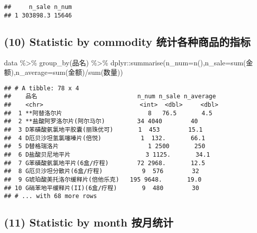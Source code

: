 \documentclass[
]{article}
\newenvironment{Shaded}{\begin{snugshade}}{\end{snugshade}}
\newcommand{\AttributeTok}[1]{\textcolor[rgb]{0.77,0.63,0.00}{#1}}
\newcommand{\FunctionTok}[1]{\textcolor[rgb]{0.00,0.00,0.00}{#1}}
\newcommand{\NormalTok}[1]{#1}
\newcommand{\SpecialCharTok}[1]{\textcolor[rgb]{0.00,0.00,0.00}{#1}}
\begin{document}
\begin{verbatim}
##     n_sale n_num
## 1 303898.3 15646
\end{verbatim}

\hypertarget{statistic-by-commodity-ux7edfux8ba1ux5404ux79cdux5546ux54c1ux7684ux6307ux6807}{%
\subsection{(10) Statistic by commodity
统计各种商品的指标}\label{statistic-by-commodity-ux7edfux8ba1ux5404ux79cdux5546ux54c1ux7684ux6307ux6807}}

\begin{Shaded}
\begin{Highlighting}[]
\NormalTok{data }\SpecialCharTok{\%\textgreater{}\%} \FunctionTok{group\_by}\NormalTok{(品名) }\SpecialCharTok{\%\textgreater{}\%}\NormalTok{ dplyr}\SpecialCharTok{::}\FunctionTok{summarise}\NormalTok{(}\AttributeTok{n\_num=}\FunctionTok{n}\NormalTok{(),}\AttributeTok{n\_sale=}\FunctionTok{sum}\NormalTok{(金额),}\AttributeTok{n\_average=}\FunctionTok{sum}\NormalTok{(金额)}\SpecialCharTok{/}\FunctionTok{sum}\NormalTok{(数量))}
\end{Highlighting}
\end{Shaded}

\begin{verbatim}
## # A tibble: 78 x 4
##    品名                            n_num n_sale n_average
##    <chr>                           <int>  <dbl>     <dbl>
##  1 **阿替洛尔片                        8   76.5       4.5
##  2 **盐酸阿罗洛尔片(阿尔马尔)         34 4040        40  
##  3 D苯磺酸氨氯地平胶囊(丽珠优可)       1  453        15.1
##  4 D厄贝沙坦氢氯噻嗪片(倍悦)           1  132.       66.1
##  5 D替格瑞洛片                         1 2500       250  
##  6 D盐酸贝尼地平片                     3 1125.       34.1
##  7 G苯磺酸氨氯地平片(6盒/疗程)        72 2968.       12.5
##  8 G厄贝沙坦分散片(6盒/疗程)           9  576        32  
##  9 G琥珀酸美托洛尔缓释片(倍他乐克)   195 9648.       19.0
## 10 G硝苯地平缓释片(II)(6盒/疗程)       9  480        30  
## # ... with 68 more rows
\end{verbatim}

\hypertarget{statistic-by-month-ux6309ux6708ux7edfux8ba1}{%
\subsection{(11) Statistic by month
按月统计}\label{statistic-by-month-ux6309ux6708ux7edfux8ba1}}
\end{document}
